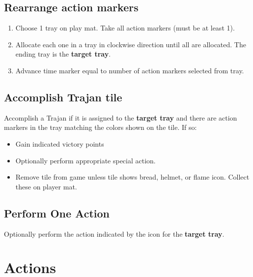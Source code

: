 \documentclass[10pt]{article}
\newenvironment{enumerateCustom}
{\begin{enumerate}
  \setlength{\itemsep}{1pt}
  \setlength{\parskip}{0pt}
  \setlength{\parsep}{0pt}}
{\end{enumerate}}
\newenvironment{itemizeCustom}
{\begin{itemize}
  \setlength{\itemsep}{1pt}
  \setlength{\parskip}{0pt}
  \setlength{\parsep}{0pt}}
{\end{itemize}}
\begin{document}
\begin{multicols*}{2}
\subsection*{Rearrange action markers}
    \begin{enumerateCustom}
        \item Choose 1 tray on play mat. Take all action markers (must be at least 1). 
        \item Allocate each one in a tray in clockwise direction until all are allocated. The ending tray is the \textbf{target tray}. 
        \item Advance time marker equal to number of action markers selected from tray.
    \end{enumerateCustom}

\subsection*{Accomplish Trajan tile}
    Accomplish a Trajan if it is assigned to the \textbf{target tray} and there are action markers in the tray matching the colors shown on the tile. If so:
    \begin{itemizeCustom}
        \item Gain indicated victory points
        \item Optionally perform appropriate special action.
        \item Remove tile from game unless tile shows bread, helmet, or flame icon. Collect these on player mat.
    \end{itemizeCustom}

\subsection*{Perform One Action}
    Optionally perform the action indicated by the icon for the \textbf{target tray}.

\section*{Actions}

\end{multicols*}
\end{document}
